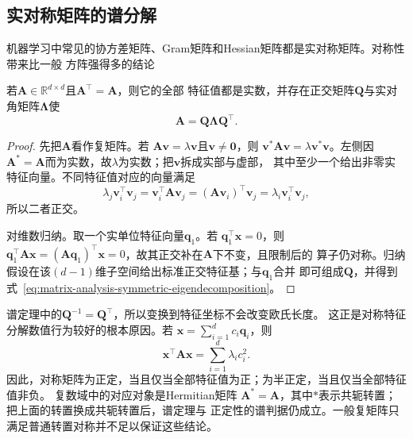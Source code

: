 \subsection{实对称矩阵的谱分解}

机器学习中常见的协方差矩阵、Gram矩阵和Hessian矩阵都是实对称矩阵。对称性带来比一般
方阵强得多的结论

\begin{theorem}[实对称矩阵的谱定理]
\label{thm:matrix-analysis-symmetric-spectral-theorem}
若$\bm{A}\in\mathbb{R}^{d\times d}$且$\bm{A}^{\top}=\bm{A}$，则它的全部
特征值都是实数，并存在正交矩阵$\bm{Q}$与实对角矩阵$\bm{\Lambda}$使
\begin{equation}
  \bm{A}=\bm{Q}\bm{\Lambda}\bm{Q}^{\top}.
  \label{eq:matrix-analysis-symmetric-eigendecomposition}
\end{equation}
\end{theorem}

\begin{proof}
先把$\bm{A}$看作复矩阵。若
$\bm{A}\bm{v}=\lambda\bm{v}$且$\bm{v}\neq\bm{0}$，则
$\bm{v}^{*}\bm{A}\bm{v}=\lambda\bm{v}^{*}\bm{v}$。左侧因
$\bm{A}^{*}=\bm{A}$而为实数，故$\lambda$为实数；把$\bm{v}$拆成实部与虚部，
其中至少一个给出非零实特征向量。不同特征值对应的向量满足
\[
  \lambda_j\bm{v}_i^{\top}\bm{v}_j
  =\bm{v}_i^{\top}\bm{A}\bm{v}_j
  =(\bm{A}\bm{v}_i)^{\top}\bm{v}_j
  =\lambda_i\bm{v}_i^{\top}\bm{v}_j,
\]
所以二者正交。

对维数归纳。取一个实单位特征向量$\bm{q}_1$。若
$\bm{q}_1^{\top}\bm{x}=0$，则
$\bm{q}_1^{\top}\bm{A}\bm{x}
=(\bm{A}\bm{q}_1)^{\top}\bm{x}=0$，故其正交补在$\bm{A}$下不变，且限制后的
算子仍对称。归纳假设在该$(d-1)$维子空间给出标准正交特征基；与$\bm{q}_1$合并
即可组成$\bm{Q}$，并得到式~\eqref{eq:matrix-analysis-symmetric-eigendecomposition}。
\end{proof}

谱定理中的$\bm{Q}^{-1}=\bm{Q}^{\top}$，所以变换到特征坐标不会改变欧氏长度。
这正是对称特征分解数值行为较好的根本原因。若
$\bm{x}=\sum_{i=1}^{d}c_i\bm{q}_i$，则
\begin{equation}
  \bm{x}^{\top}\bm{A}\bm{x}=\sum_{i=1}^{d}\lambda_i c_i^2.
  \label{eq:matrix-analysis-quadratic-spectral-form}
\end{equation}
因此，对称矩阵为正定，当且仅当全部特征值为正；为半正定，当且仅当全部特征值非负。
复数域中的对应对象是Hermitian矩阵
$\bm{A}^{*}=\bm{A}$，其中$*$表示共轭转置；把上面的转置换成共轭转置后，谱定理与
正定性的谱判据仍成立。一般复矩阵只满足普通转置对称并不足以保证这些结论。


